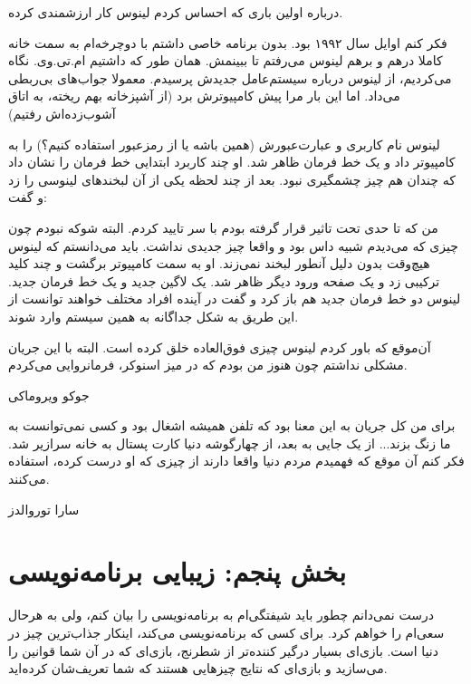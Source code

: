 \newpage
\begin{wellbox}
درباره اولین باری که احساس کردم لینوس کار ارزشمندی کرده.

فکر کنم اوایل سال ۱۹۹۲ بود. بدون برنامه خاصی داشتم با دوچرخه‌ام به سمت
خانه کاملا درهم و برهم لینوس می‌رفتم تا ببینمش. همان طور که داشتیم
ام.تی.وی. نگاه می‌کردیم، از لینوس درباره سیستم‌عامل جدیدش پرسیدم. معمولا
جواب‌های بی‌ربطی می‌داد. اما این بار مرا پیش کامپیوترش برد (از‌‌ آشپزخانه
بهم ریخته،‌ به اتاق آشوب‌زده‌اش رفتیم)

لینوس نام کاربری و عبارت‌عبورش (همین باشه یا از رمزعبور استفاده کنیم؟)
را به کامپیوتر داد و یک خط فرمان ظاهر شد. او چند کاربرد ابتدایی خط
فرمان را نشان داد که چندان هم چیز چشمگیری نبود. بعد از چند لحظه یکی از
آن لبخندهای لینوسی را زد و گفت: 

من که تا حدی تحت تاثیر قرار گرفته بودم با سر تایید کردم. البته شوکه
نبودم چون چیزی که می‌دیدم شبیه داس بود و واقعا چیز جدیدی نداشت. باید
می‌دانستم که لینوس هیچ‌وقت بدون دلیل آنطور لبخند نمی‌زند. او به سمت
کامپیوتر برگشت و چند کلید ترکیبی زد و یک صفحه ورود دیگر ظاهر شد. یک
لاگین جدید و یک خط فرمان جدید. لینوس دو خط فرمان جدید هم باز کرد و گفت
در آینده افراد مختلف خواهند توانست از این طریق به شکل جداگانه به همین
سیستم وارد شوند.

آن‌موقع که باور کردم لینوس چیزی فوق‌العاده خلق کرده است. البته با این
جریان مشکلی نداشتم چون هنوز من بودم که در میز اسنوکر، فرمانروایی
می‌کردم.

\vspace*{10pt}
\hfill جوکو  ویروماکی
\end{wellbox}

\begin{wellbox}
برای من کل جریان به این معنا بود که تلفن همیشه اشغال بود و کسی
نمی‌توانست به ما زنگ بزند... از یک جایی به بعد، از چهارگوشه دنیا کارت
پستال به خانه سرازیر شد. فکر کنم آن موقع که فهمیدم مردم دنیا واقعا
دارند از چیزی که او درست کرده، استفاده می‌کنند.

\hfill سارا توروالدز
\end{wellbox}

\section{بخش پنجم: زیبایی برنامه‌نویسی}
درست نمی‌دانم چطور باید شیفتگی‌ام به برنامه‌‌نویسی را بیان کنم، ولی به
هرحال سعی‌ام را خواهم کرد. برای کسی که برنامه‌نویسی می‌کند، اینکار
جذاب‌ترین چیز در دنیا است. بازی‌ای بسیار درگیر کننده‌تر از شطرنج، بازی‌ای
که در آن شما قوانین را می‌سازید و بازی‌ای که نتایج چیزهایی هستند که شما
تعریف‌شان کرده‌اید.

